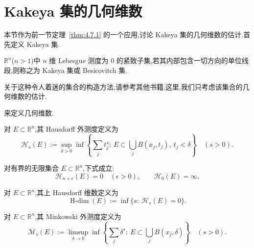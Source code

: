 \section{Kakeya 集的几何维数}\label{sec:4.8}


本节作为前一节定理~\ref{thm:4.7.1} 的一个应用,讨论 Kakeya 集的几何维数的估计.首先定义 Kakeya 集.

\begin{definition}\label{def:4.8.1}
$\mathbb{R}^{n}$($n > 1$)中 $n$ 维 Lebesgue 测度为 0 的紧致子集,若其内部包含一切方向的单位线段,则称之为 Kakeya 集或 Besicovitch 集.
\end{definition}

关于这种令人着迷的集合的构造方法,请参考其他书籍.这里,我们只考虑该集合的几何维数的估计.

来定义几何维数.

\begin{definition}\label{def:4.8.2}
对 $E \subset \mathbb{R}^{n}$,其 Hausdorff 外测度定义为
\begin{equation*}
\mathcal{H}_{s}(E) := \sup_{\delta > 0}\inf\left\{\sum_{j}t_{j}^{s}:\ E \subset \bigcup_{j}B(x_{j},t_{j}),\ t_{j} < \delta\right\} \quad (s > 0).
\end{equation*}
\end{definition}

对有界的无限集合 $E \subset \mathbb{R}^{n}$,下式成立:
\[
\mathcal{H}_{n+\epsilon}(E) = 0 \quad (\epsilon > 0), \qquad \mathcal{H}_{0}(E) = \infty.
\]

\begin{definition}\label{def:4.8.3}
对 $E \subset \mathbb{R}^{n}$,其上 Hausdorff 维数定义为
\begin{equation*}
\operatorname{H-dim}(E) := \inf\{s:\ \mathcal{H}_{s}(E) = 0\}.
\end{equation*}
\end{definition}

\begin{definition}\label{def:4.8.4}
对 $E \subset \mathbb{R}^{n}$,其 Minkowski 外测度定义为
\begin{equation*}
\mathcal{M}_{s}(E) := \limsup_{\delta \to 0}\inf\left\{\sum_{j}\delta^{s}:\ E \subset \bigcup_{j}B(x_{j},\delta)\right\} \quad (s > 0).
\end{equation*}
\end{definition}

